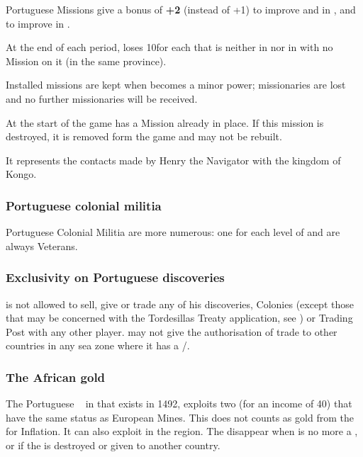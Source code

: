 \aparag Portuguese Missions give a bonus of {\bf +2} (instead of +1)
to improve \TP and \COL in , and to improve \COL in
.

\aparag At the end of each period, \POR loses 10\VPs for each \COL
that is neither in  nor in 
with no Mission on it (in the same province).

\aparag Installed missions are kept when  becomes a minor
power; missionaries are lost and no further missionaries will be
received.

 At the start of the
game \POR has a Mission already in place. If this mission is destroyed, it
is removed form the game and may not be rebuilt.

\begin{designnote}
  It represents the contacts made by Henry the Navigator with the
  kingdom of Kongo.
\end{designnote}

\subsubsection{Portuguese colonial militia}
\aparag Portuguese Colonial Militia are more numerous: one \LDE for each
level of \COL and are always Veterans.

\subsubsection{Exclusivity on Portuguese discoveries}
\aparag \POR is not allowed to sell, give or trade any of his
discoveries, Colonies (except those that may be concerned with the
Tordesillas Treaty application, see ) or
Trading Post with any other player.
 \POR may not give the authorisation of trade
to other countries in any sea zone where it has a \COL/\TP.

\subsubsection{The African gold}\label{chSpecific:Portugal:African Gold}
 The Portuguese \TP\
 in  that exists in 1492,
exploits two \RES{Gold Mines} (for an income of 40\ducats) that have
the same status as European Mines. This does not counts as gold from
the \ROTW for Inflation. It can also exploit \RES{Slaves} in the
region. The \RES{Gold Mines} disappear when \POR is no more a \MAJ, or
if the \TP is destroyed or given to another country.

